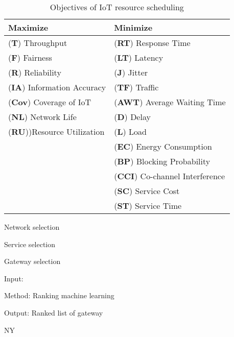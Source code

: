\begin{table}[h!]
	\begin{tabulary}{\textwidth}{L|L}
	\textbf{Maximize}         & \textbf{Minimize}             \\\hline
	(\textbf{T}) Throughput            & (\textbf{RT}) Response Time            \\
	(\textbf{F}) Fairness              & (\textbf{LT}) Latency                  \\
	(\textbf{R}) Reliability           & (\textbf{J}) Jitter                    \\
	(\textbf{IA}) Information Accuracy & (\textbf{TF})  Traffic                 \\
	(\textbf{Cov}) Coverage of IoT     & (\textbf{AWT}) Average Waiting Time    \\
	(\textbf{NL}) Network Life         & (\textbf{D})  Delay                    \\
	(\textbf{RU}))Resource Utilization & (\textbf{L}) Load                      \\
	\                         & (\textbf{EC}) Energy Consumption       \\
	\                         & (\textbf{BP})  Blocking Probability    \\
	\                         & (\textbf{CCI})  Co-channel Interference\\
	\                         & (\textbf{SC}) Service Cost             \\
	\                         & (\textbf{ST})   Service Time           \\
	\end{tabulary}
\caption{\label{tab:scheduling} Objectives of IoT resource scheduling}
\end{table}






Network selection

Service selection

Gateway selection

Input:
	

Method:
	Ranking machine learning

Output:
	Ranked list of gateway




\ac{NY}

